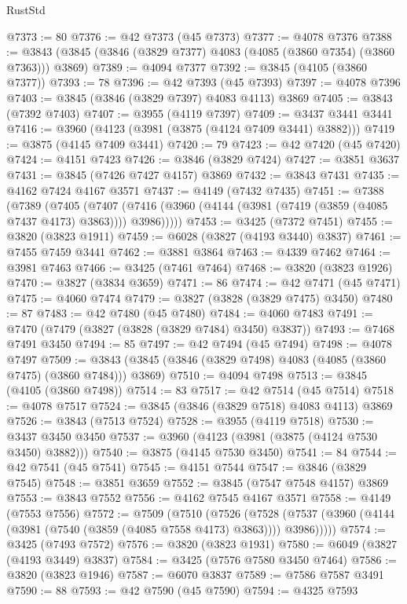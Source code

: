 \begin{lexlean}{RustStd}
\begin{coremodule}
@7373 := 80
@7376 := @42 @7373 (@45 @7373)
@7377 := @4078 @7376
@7388 := @3843 (@3845 (@3846 (@3829 @7377) @4083 (@4085 (@3860 @7354) (@3860 @7363))) @3869)
@7389 := @4094 @7377
@7392 := @3845 (@4105 (@3860 @7377))
@7393 := 78
@7396 := @42 @7393 (@45 @7393)
@7397 := @4078 @7396
@7403 := @3845 (@3846 (@3829 @7397) @4083 @4113) @3869
@7405 := @3843 (@7392 @7403)
@7407 := @3955 (@4119 @7397)
@7409 := @3437 @3441 @3441
@7416 := @3960 (@4123 (@3981 (@3875 (@4124 @7409 @3441) @3882)))
@7419 := @3875 (@4145 @7409 @3441)
@7420 := 79
@7423 := @42 @7420 (@45 @7420)
@7424 := @4151 @7423
@7426 := @3846 (@3829 @7424)
@7427 := @3851 @3637
@7431 := @3845 (@7426 @7427 @4157) @3869
@7432 := @3843 @7431
@7435 := @4162 @7424 @4167 @3571
@7437 := @4149 (@7432 @7435)
@7451 := @7388
    (@7389
      (@7405
        (@7407 (@7416 (@3960 (@4144 (@3981 (@7419 (@3859 (@4085 @7437 @4173) @3863)))) @3986)))))
@7453 := @3425 (@7372 @7451)
@7455 := @3820 (@3823 @1911)
@7459 := @6028 (@3827 (@4193 @3440) @3837)
@7461 := @7455 @7459 @3441
@7462 := @3881 @3864
@7463 := @4339 @7462
@7464 := @3981 @7463
@7466 := @3425 (@7461 @7464)
@7468 := @3820 (@3823 @1926)
@7470 := @3827 (@3834 @3659)
@7471 := 86
@7474 := @42 @7471 (@45 @7471)
@7475 := @4060 @7474
@7479 := @3827 (@3828 (@3829 @7475) @3450)
@7480 := 87
@7483 := @42 @7480 (@45 @7480)
@7484 := @4060 @7483
@7491 := @7470 (@7479 (@3827 (@3828 (@3829 @7484) @3450) @3837))
@7493 := @7468 @7491 @3450
@7494 := 85
@7497 := @42 @7494 (@45 @7494)
@7498 := @4078 @7497
@7509 := @3843 (@3845 (@3846 (@3829 @7498) @4083 (@4085 (@3860 @7475) (@3860 @7484))) @3869)
@7510 := @4094 @7498
@7513 := @3845 (@4105 (@3860 @7498))
@7514 := 83
@7517 := @42 @7514 (@45 @7514)
@7518 := @4078 @7517
@7524 := @3845 (@3846 (@3829 @7518) @4083 @4113) @3869
@7526 := @3843 (@7513 @7524)
@7528 := @3955 (@4119 @7518)
@7530 := @3437 @3450 @3450
@7537 := @3960 (@4123 (@3981 (@3875 (@4124 @7530 @3450) @3882)))
@7540 := @3875 (@4145 @7530 @3450)
@7541 := 84
@7544 := @42 @7541 (@45 @7541)
@7545 := @4151 @7544
@7547 := @3846 (@3829 @7545)
@7548 := @3851 @3659
@7552 := @3845 (@7547 @7548 @4157) @3869
@7553 := @3843 @7552
@7556 := @4162 @7545 @4167 @3571
@7558 := @4149 (@7553 @7556)
@7572 := @7509
    (@7510
      (@7526
        (@7528 (@7537 (@3960 (@4144 (@3981 (@7540 (@3859 (@4085 @7558 @4173) @3863)))) @3986)))))
@7574 := @3425 (@7493 @7572)
@7576 := @3820 (@3823 @1931)
@7580 := @6049 (@3827 (@4193 @3449) @3837)
@7584 := @3425 (@7576 @7580 @3450 @7464)
@7586 := @3820 (@3823 @1946)
@7587 := @6070 @3837
@7589 := @7586 @7587 @3491
@7590 := 88
@7593 := @42 @7590 (@45 @7590)
@7594 := @4325 @7593

\end{coremodule}
\end{lexlean}
